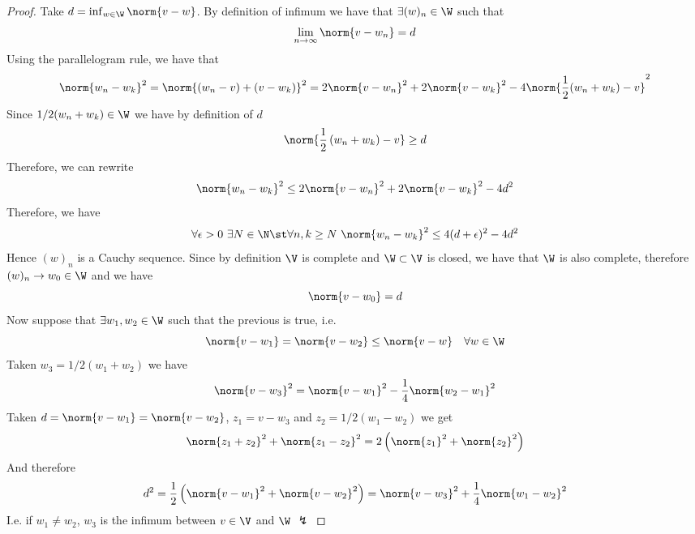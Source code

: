 \documentclass[../mmf.tex]{subfiles}
\begin{document}
\begin{proof}
	Take $d=\inf_{w\in\W}\norm{v-w}$. By definition of infimum we have that $\exists(w)_n\in\W$ such that
	\begin{equation*}
		\lim_{n\to\infty}\norm{v-w_n}=d
	\end{equation*}
	Using the parallelogram rule, we have that
	\begin{equation*}
		\norm{w_n-w_k}^2=\norm{(w_n-v)+(v-w_k)}^2=2\norm{v-w_n}^2+2\norm{v-w_k}^2-4\norm{\frac{1}{2}(w_n+w_k)-v}^2
	\end{equation*}
	Since $1/2(w_n+w_k)\in\W$ we have by definition of $d$
	\begin{equation*}
		\norm{\frac{1}{2}\left( w_n+w_k \right)-v}\ge d
	\end{equation*}
	Therefore, we can rewrite
	\begin{equation*}
		\norm{w_n-w_k}^2\le2\norm{v-w_n}^2+2\norm{v-w_k}^2-4d^2
	\end{equation*}
	Therefore, we have
	\begin{equation*}
		\forall\epsilon>0\ \exists N\in\N\st\forall n,k\ge N\ \norm{w_n-w_k}^2\le4(d+\epsilon)^2-4d^2
	\end{equation*}
	Hence $(w)_n$ is a Cauchy sequence. Since by definition $\V$ is complete and $\W\subset\V$ is closed, we have that $\W$ is also complete, therefore $(w)_n\to w_0\in\W$ and we have
	\begin{equation*}
		\norm{v-w_0}=d
	\end{equation*}
	Now suppose that $\exists w_1,w_2\in\W$ such that the previous is true, i.e.
	\begin{equation*}
		\norm{v-w_1}=\norm{v-w_2}\le\norm{v-w}\quad\forall w\in\W
	\end{equation*}
	Taken $w_3=1/2(w_1+w_2)$ we have
	\begin{equation*}
		\norm{v-w_3}^2=\norm{v-w_1}^2-\frac{1}{4}\norm{w_2-w_1}^2
	\end{equation*}
	Taken $d=\norm{v-w_1}=\norm{v-w_2}$, $z_1=v-w_3$ and $z_2=1/2(w_1-w_2)$ we get
	\begin{equation*}
		\norm{z_1+z_2}^2+\norm{z_1-z_2}^2=2\left( \norm{z_1}^2+\norm{z_2}^2 \right)
	\end{equation*}
	And therefore
	\begin{equation*}
		d^2=\frac{1}{2}\left( \norm{v-w_1}^2+\norm{v-w_2}^2 \right)=\norm{v-w_3}^2+\frac{1}{4}\norm{w_1-w_2}^2
	\end{equation*}
	I.e. if $w_1\ne w_2$, $w_3$ is the infimum between $v\in\V$ and $\W$ $\lightning$
\end{proof}
\end{document}
